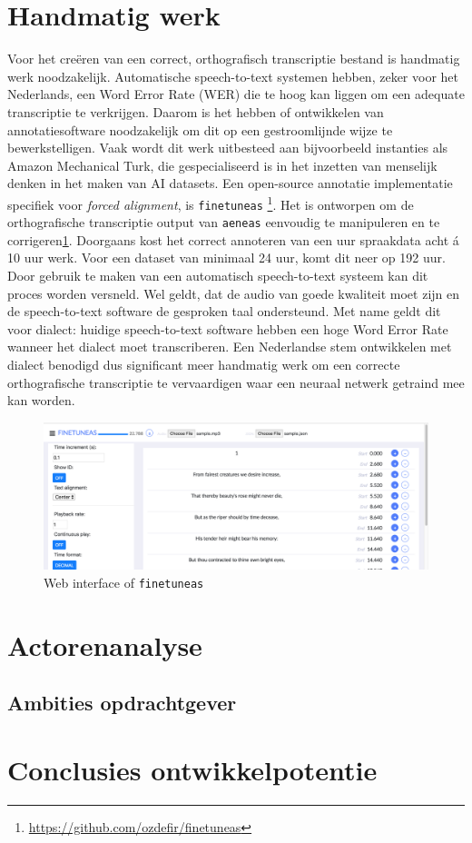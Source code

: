 \section{Handmatig werk}
Voor het creëren van een correct, orthografisch transcriptie bestand is handmatig werk noodzakelijk. Automatische speech-to-text systemen hebben, zeker voor het Nederlands, een Word Error Rate (WER) die te hoog kan liggen om een adequate transcriptie te verkrijgen. Daarom is het hebben of ontwikkelen van annotatiesoftware noodzakelijk om dit op een gestroomlijnde wijze te bewerkstelligen. Vaak wordt dit werk uitbesteed aan bijvoorbeeld instanties als Amazon Mechanical Turk, die gespecialiseerd is in het inzetten van menselijk denken in het maken van AI datasets. Een open-source annotatie implementatie specifiek voor \textit{forced alignment}, is \texttt{finetuneas} \footnote{\url{https://github.com/ozdefir/finetuneas}}. Het is ontworpen om de orthografische transcriptie output van \texttt{aeneas} eenvoudig te manipuleren en te corrigeren\ref{fig:finetuneas}. Doorgaans kost het correct annoteren van een uur spraakdata acht á 10 uur werk. Voor een dataset van minimaal 24 uur, komt dit neer op 192 uur. Door gebruik te maken van een automatisch speech-to-text systeem kan dit proces worden versneld. Wel geldt, dat de audio van goede kwaliteit moet zijn en de speech-to-text software de gesproken taal ondersteund. Met name geldt dit voor dialect: huidige speech-to-text software hebben een hoge Word Error Rate wanneer het dialect moet transcriberen. Een Nederlandse stem ontwikkelen met dialect benodigd dus significant meer handmatig werk om een correcte orthografische transcriptie te vervaardigen waar een neuraal netwerk getraind mee kan worden.

\begin{figure}
    \centering
    \includegraphics[width=\textwidth]{figures/finetuneas.png}
    \caption{Web interface of \texttt{finetuneas}}
    \label{fig:finetuneas}
\end{figure}


\section{Actorenanalyse}
\subsection{Ambities opdrachtgever}



\section{Conclusies ontwikkelpotentie}


